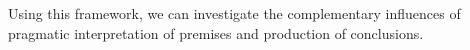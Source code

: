 \documentclass[10pt,letterpaper]{article}
\begin{document}
Using this framework, we can investigate the complementary influences of pragmatic interpretation of premises and production of conclusions. 

%
%
%
%
%
%
%
%
\end{document}

